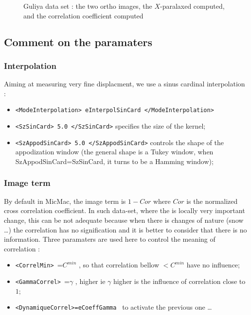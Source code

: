 \begin{figure}
\begin{center}
\end{center}
\caption{Guliya data set : the two ortho images, the $X$-paralaxed computed, and the correlation
coefficient computed}
\label{FIG:OK:Guylia}
\end{figure}




\subsection{Comment on the paramaters}


\subsubsection{Interpolation}

Aiming at measuring very fine displacment, we use a sinus cardinal interpolation :

\begin{itemize}
   \item {\tt <ModeInterpolation> eInterpolSinCard </ModeInterpolation>}

   \item  {\tt <SzSinCard>  5.0 </SzSinCard>} specifies the size of the kernel;

   \item  {\tt  <SzAppodSinCard>  5.0 </SzAppodSinCard>} controls the shape of the appodization
          window (the general shape is a Tukey window, when SzAppodSinCard=SzSinCard, it turns to be
          a Hamming window);
\end{itemize}


\subsubsection{Image term}

By default in MicMac, the image term is $1-Cor$ where $Cor$ is the normalized cross correlation
coefficient. In such data-set, where the is locally very important change, this can be not
adequate because when there is changes of nature (snow \dots)  the correlation has no 
signification and it is better to consider that there is no information.
Three paramaters are used here to control the meaning of correlation :


\begin{itemize}
   \item {\tt  <CorrelMin> }=$C^{min}$ ,  
         so  that correlation bellow $<C^{min}$ have no influence;
   \item {\tt  <GammaCorrel> }=$\gamma$  , higher ie $\gamma$ higher is the influence of correlation
         close to $1$;
   \item {\tt  <DynamiqueCorrel>=eCoeffGamma } to activate the previous one \dots
\end{itemize}

